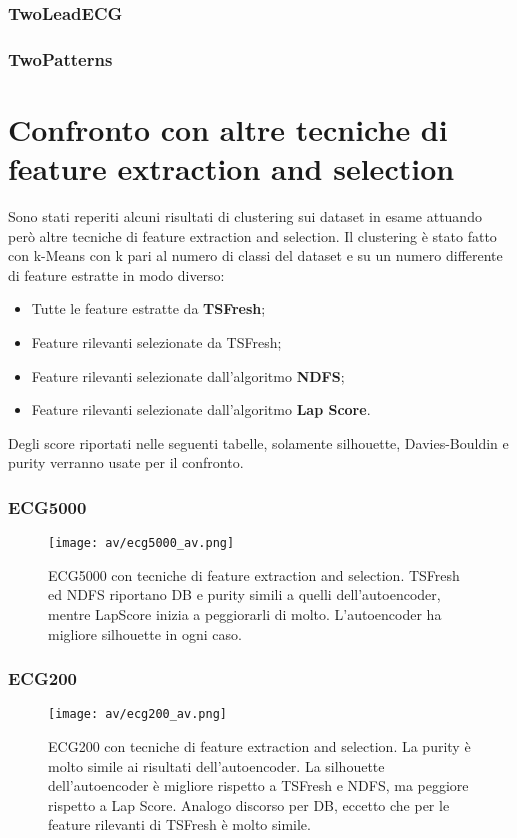 \subsubsection{TwoLeadECG}

\subsubsection{TwoPatterns}

\section{Confronto con altre tecniche di feature extraction and selection}
Sono stati reperiti alcuni risultati di clustering sui dataset in esame attuando però altre tecniche di feature extraction and selection. Il clustering è stato fatto con k-Means con k pari al numero di classi del dataset e su un numero differente di feature estratte in modo diverso:
\begin{itemize}
	\item Tutte le feature estratte da \textbf{TSFresh};
	\item Feature rilevanti selezionate da TSFresh;
	\item Feature rilevanti selezionate dall'algoritmo \textbf{NDFS};
	\item Feature rilevanti selezionate dall'algoritmo \textbf{Lap Score}.
\end{itemize}
Degli score riportati nelle seguenti tabelle, solamente silhouette, Davies-Bouldin e purity verranno usate per il confronto.

\subsubsection{ECG5000}
\begin{figure}[H]
	\centering
	\texttt{[image: av/ecg5000\_av.png]}
	\caption{ECG5000 con tecniche di feature extraction and selection. TSFresh ed NDFS riportano DB e purity simili a quelli dell'autoencoder, mentre LapScore inizia a peggiorarli di molto. L'autoencoder ha migliore silhouette in ogni caso.}
	\label{fig:ecg5000_av}
\end{figure}

\subsubsection{ECG200}
\begin{figure}[H]
	\centering
	\texttt{[image: av/ecg200\_av.png]}
	\caption{ECG200 con tecniche di feature extraction and selection. La purity è molto simile ai risultati dell'autoencoder. La silhouette dell'autoencoder è migliore rispetto a TSFresh e NDFS, ma peggiore rispetto a Lap Score. Analogo discorso per DB, eccetto che per le feature rilevanti di TSFresh è molto simile.}
	\label{fig:ecg200_av}
\end{figure}

